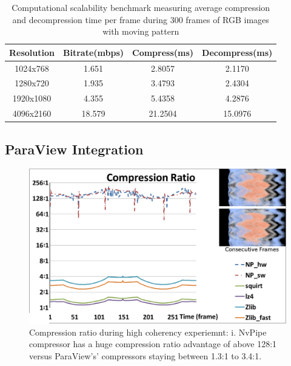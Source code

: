 \documentclass[review]{vgtc}                 %
\begin{document}
\begin{table}[h]
  \caption{Computational scalability benchmark measuring average compression and decompression time per frame during 300 frames of RGB images with moving pattern}
  \label{tab:experiment_setup}
  \scriptsize
  \begin{center}
    \begin{tabular}{cccc}
      Resolution & Bitrate(mbps) & Compress(ms) & Decompress(ms)\\
    \hline
      1024x768 & 1.651 & 2.8057 & 2.1170\\
      1280x720 & 1.935 & 3.4793 & 2.4304\\
      1920x1080 & 4.355 & 5.4358 & 4.2876\\
      4096x2160 & 18.579 & 21.2504 & 15.0976
    \end{tabular}
  \end{center}
\end{table}

\subsection{ParaView Integration}

\begin{figure}[htb]
  \centering
  \includegraphics[width=\columnwidth]{compressRatio.eps}
  \caption{Compression ratio during high coherency experiemnt: i. NvPipe compressor has a huge compression ratio advantage of above 128:1 versus ParaView's' compressors staying between 1.3:1 to 3.4:1.}
  \label{fig:compressRatio}
\end{figure}
\end{document}
